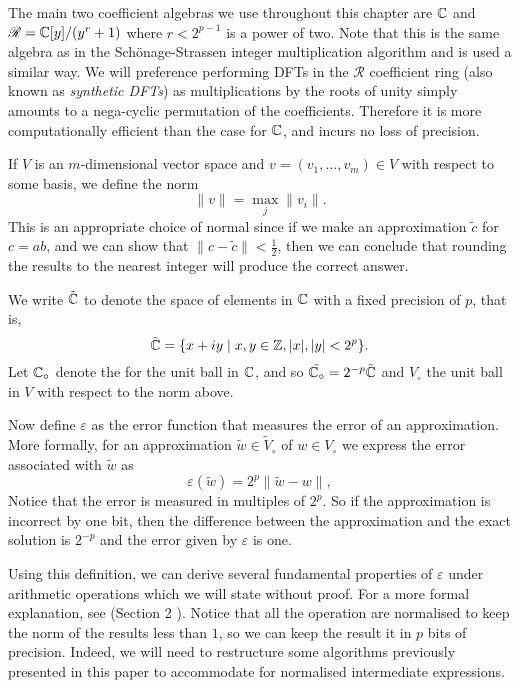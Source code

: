 The main two coefficient algebras we use throughout this chapter are ${\mathbb C}$ and $\mathscr{R} = {\mathbb C}[y]/(y^r + 1)$ where $r < 2^{p-1}$ is a power of two. Note that this is the same algebra as in the Sch\"{o}nage-Strassen integer multiplication algorithm and is used a similar way.
We will preference performing DFTs in the $\mathscr{R}$ coefficient ring (also known as \textit{synthetic DFTs}) as multiplications by the roots of unity simply amounts to a nega-cyclic permutation of the coefficients. Therefore it is more computationally efficient than the case for ${\mathbb C}$, and incurs no loss of precision.

If $V$ is an $m$-dimensional vector space and $v = (v_1, \ldots, v_m) \in V$ with respect to some basis, we define the norm
\[
    \|v\| = \max_j \|v_i\|.
\]
This is an appropriate choice of normal since if we make an approximation $\tilde{c}$ for $c = ab$, and we can show that $\|c - \tilde{c}\| < \frac{1}{2}$, then we can conclude that rounding the results to the nearest integer will produce the correct answer.

We write $\tilde{{\mathbb C}}$ to denote the space of elements in ${\mathbb C}$ with a fixed precision of $p$, that is, 
\[
    \tilde{{\mathbb C}} = \{x + iy \;\vert \; x, y \in {\mathbb Z}, |x|, |y| < 2^p \}.
\]
Let ${\mathbb C}_\circ$ denote the for the unit ball in ${\mathbb C}$, and so $\tilde{{\mathbb C}_{\circ}} = 2^{-p} \tilde{{\mathbb C}}$ and $V_\circ$ the unit ball in $V$ with respect to the norm above.

Now define $\varepsilon$ as the error function that measures the error of an approximation. More formally, for an approximation $\tilde{w} \in \tilde{V}_\circ$ of $w \in V_\circ$ we express the error associated with $\tilde{w}$ as
\[
    \varepsilon(\tilde{w}) = 2^p \|\tilde{w} - w\|,
\]
Notice that the error is measured in multiples of $2^p$. So if the approximation is incorrect by one bit, then the difference between the approximation and the exact solution is $2^{-p}$ and the error given by $\varepsilon$ is one.

Using this definition, we can derive several fundamental properties of $\varepsilon$ under arithmetic operations which we will state without proof. For a more formal explanation, see (Section 2 \cite{nlogn}). Notice that all the operation are normalised to keep the norm of the results less than $1$, so we can keep the result it in $p$ bits of precision. Indeed, we will need to restructure some algorithms previously presented in this paper to accommodate for normalised intermediate expressions.

